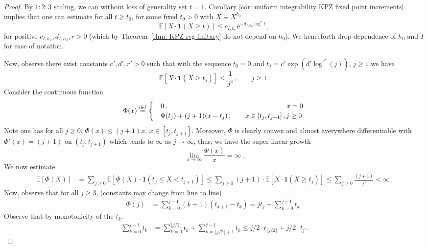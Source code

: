 \documentclass[11pt, reqno]{amsart}
\numberwithin{equation}{section}
\begin{document}
\begin{proof}
By $1:2:3$ scaling, we can without loss of generality set $t = 1$. Corollary \ref{cor: uniform integrability KPZ fixed point increments} implies that one can estimate for all $t\ge t_0$, for some fixed $t_0> 0$ with $X\equiv X^{h_0}$
\begin{equation*}
\mathbb{E}[X\cdot \mathbf{1}(X\ge t)]\le c_{I, h_0}\mathrm{e}^{-d_{I, h_0}\log^r t}\,,
\end{equation*}
for positive $c_{I, h_0}, d_{I, h_0}, r> 0$ (which by Theorem~\ref{thm: KPZ reg finitary} do not depend on $h_0$). We henceforth drop dependence of $h_0$ and $I$ for ease of notation.

Now, observe there exist constants $c', d', r'>0$ such that with the sequence $t_0=0$ and $t_j = c'\exp(d'\log^{r'}(j))$, $j\ge 1$ we have
\begin{equation*}
\mathbb{E}[X\cdot \mathbf{1}(X\ge t_j)]\le \frac{1}{j^3}\,,\qquad j\ge 1\,.
\end{equation*}
Consider the continuous function
\begin{align*}
\Phi(x) \stackrel{\mathrm{def}}{=} \begin{cases}
    &0\,,\hfill\qquad x=0\;\\
    &\Phi(t_j) + (j+1)(x-t_j)\,,\qquad x\in [t_j, t_{j+1}]\,,j\ge 0\,.
\end{cases}
\end{align*}
Note one has for all $j\ge 0$, $\Phi(x) \le (j+1)x$, $x\in [t_j, t_{j+1}]$. Moreover, $\Phi$ is clearly convex and almost everywhere differentiable with $\Phi'(x) = (j+1)$ on $(t_j, t_{j+1})$ which tends to $\infty$ as $j\to \infty$, thus, we have the super linear growth
\begin{equation*}
\lim_{x\to \infty}\frac{\Phi(x)}{x} = \infty\,.
\end{equation*}
We now estimate
\begin{align*}
\mathbb{E}[\Phi(X)]&= \sum_{j\ge 0}\mathbb{E}[\Phi(X)\cdot\mathbf{1}(t_j \le X< t_{j+1})]\le \sum_{j\ge 0}(j+1)\cdot\mathbb{E}[X\cdot\mathbf{1}(X\ge t_j)]\le \sum_{j\ge 0}\frac{(j+1)}{j^3}<\infty\,.
\end{align*}
Now, observe that for all $j\ge 3$, (constants may change from line to line)
\begin{align*}
    \Phi(j)  &= \sum_{k = 0}^{j-1} (k+1)(t_{k+1}-t_k) = jt_{j}- \sum_{k = 0}^{j-1}t_k\,.
\end{align*}
Observe that by monotonicity of the $t_k$,
\begin{align*}
    \sum_{k = 0}^{j-1}t_k &= \sum_{k = 0}^{\lfloor j/2\rfloor}t_k + \sum_{k = \lfloor j/2\rfloor+1}^{j-1}t_k \le j/2\cdot t_{\lfloor j/2\rfloor} + j/2 \cdot t_{j}\,.

\end{align*}
\end{proof}
\end{document}
